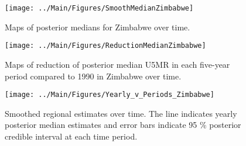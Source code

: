 \documentclass[12pt]{article}\usepackage[]{graphicx}\usepackage[]{color}
\newenvironment{knitrout}{}{} %
\begin{document}
\begin{knitrout}
\color{fgcolor}\begin{figure}[bht]

{\centering \texttt{[image: ../Main/Figures/SmoothMedianZimbabwe]} 

}

\caption[Maps of posterior medians for Zimbabwe  over time]{Maps of posterior medians for Zimbabwe  over time.}\label{fig:unnamed-chunk-344}
\end{figure}


\end{knitrout}
\begin{knitrout}
\color{fgcolor}\begin{figure}[bht]

{\centering \texttt{[image: ../Main/Figures/ReductionMedianZimbabwe]} 

}

\caption[Maps of reduction of posterior median U5MR in each five-year period compared to 1990 in Zimbabwe over time]{Maps of reduction of posterior median U5MR in each five-year period compared to 1990 in Zimbabwe over time.}\label{fig:unnamed-chunk-345}
\end{figure}


\end{knitrout}
\begin{knitrout}
\color{fgcolor}\begin{figure}[bht]

{\centering \texttt{[image: ../Main/Figures/Yearly\_v\_Periods\_Zimbabwe]} 

}

\caption[Smoothed regional estimates over time]{Smoothed regional estimates over time. The line indicates yearly posterior median estimates and error bars indicate 95 \% posterior credible interval at each time period.}\label{fig:unnamed-chunk-346}
\end{figure}


\end{knitrout}
\end{document}
